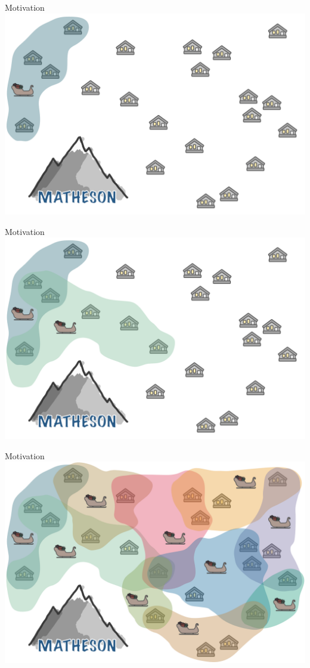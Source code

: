 \documentclass[10pt]{beamer}
\begin{document}
\begin{frame}[fragile]{Motivation}
    \hspace*{-.25em}\includegraphics[width=\textwidth]{Images/Matheson/Matheson_03}
\end{frame}

\begin{frame}[fragile]{Motivation}
    \hspace*{-.25em}\includegraphics[width=\textwidth]{Images/Matheson/Matheson_04}
\end{frame}

\begin{frame}[fragile]{Motivation}
    \hspace*{-.25em}\includegraphics[width=\textwidth]{Images/Matheson/Matheson_05}
\end{frame}
\end{document}
